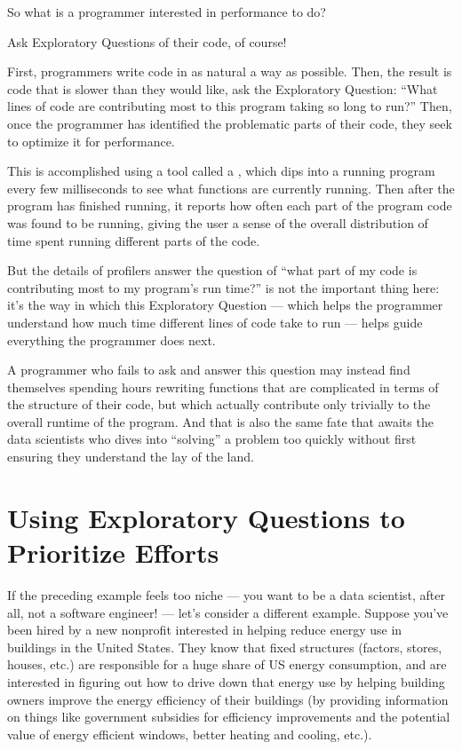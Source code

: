 \documentclass[letterpaper,10pt,english]{jupyterBook}
\begin{document}
\sphinxAtStartPar
So what is a programmer interested in performance to do?

\sphinxAtStartPar
Ask Exploratory Questions of their code, of course!

\sphinxAtStartPar
First, programmers write code in as natural a way as possible. Then,  the result is code that is slower than they would like, ask the Exploratory Question: “What lines of code are contributing most to this program taking so long to run?” Then, once the programmer has identified the problematic parts of their code, they seek to optimize it for performance.

\sphinxAtStartPar
This is accomplished using a tool called a , which dips into a running program every few milliseconds to see what functions are currently running. Then after the program has finished running, it reports how often each part of the program code was found to be running, giving the user a sense of the overall distribution of time spent running different parts of the code.

\sphinxAtStartPar
But the details of  profilers answer the question of “what part of my code is contributing most to my program’s run time?” is not the important thing here: it’s the way in which this Exploratory Question — which helps the programmer understand how much time different lines of code take to run  — helps guide everything the programmer does next.

\sphinxAtStartPar
A programmer who fails to ask and answer this question may instead find themselves spending hours re\sphinxhyphen{}writing functions that are complicated in terms of the structure of their code, but which actually contribute only trivially to the overall runtime of the program. And that is also the same fate that awaits the data scientists who dives into “solving” a problem too quickly without first ensuring they understand the lay of the land.




\section{Using Exploratory Questions to Prioritize Efforts}
\label{\detokenize{30_questions/10_using_exploratory_questions:using-exploratory-questions-to-prioritize-efforts}}
\sphinxAtStartPar
If the preceding example feels too niche — you want to be a data scientist, after all, not a software engineer! — let’s consider a different example. Suppose you’ve been hired by a new non\sphinxhyphen{}profit interested in helping reduce energy use in buildings in the United States. They know that fixed structures (factors, stores, houses, etc.) are responsible for a huge share of US energy consumption, and are interested in figuring out how to drive down that energy use by helping building owners improve the energy efficiency of their buildings (by providing information on things like government subsidies for efficiency improvements and the potential value of energy efficient windows, better heating and cooling, etc.).
\end{document}
